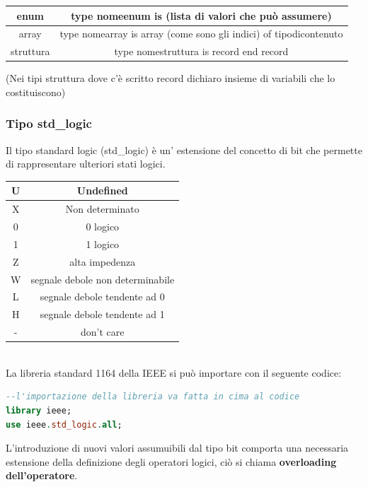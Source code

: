 \documentclass[a4paper]{book}
\begin{document}
\begin{itemize}
\begin{tabular}{|c|c|}
\hline
enum & type nomeenum is (lista di valori che può assumere)\\
\hline
array & type nomearray is array (come sono gli indici) of tipodicontenuto \\
\hline
struttura & type nomestruttura is record end record \\
\hline

\end{tabular}

(Nei tipi struttura dove c'è scritto record dichiaro insieme di variabili che lo costituiscono)

\end{itemize}

\newpage
\subsubsection{Tipo std\_logic}

Il tipo standard logic (std\_logic) è un' estensione del concetto di bit che permette di rappresentare ulteriori stati logici.\vspace{\baselineskip}\\
\begin{tabular}{|c|c|}
\hline
U & Undefined \\
\hline
X & Non determinato \\
\hline
0 & 0 logico \\
\hline
1 & 1 logico \\
\hline
Z & alta impedenza \\
\hline
W & segnale debole non determinabile \\
\hline
L & segnale debole tendente ad 0 \\
\hline
H & segnale debole tendente ad 1 \\
\hline
- & don't care \\
\hline
\end{tabular}
\vspace{\baselineskip}\\
La libreria standard 1164 della IEEE si può importare con il seguente codice:

\begin{lstlisting}[language= VHDL]
--l'importazione della libreria va fatta in cima al codice
library ieee;
use ieee.std_logic.all;

\end{lstlisting}

L'introduzione di nuovi valori assumuibili dal tipo bit comporta una necessaria estensione della definizione degli operatori logici, ciò si chiama \textbf{overloading dell'operatore}.
\end{document}
